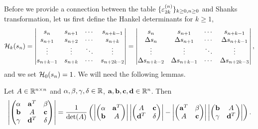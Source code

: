Before we provide a connection between the table $\{ \varepsilon_{2k}^{(n)} \}_{k\ge 0, n\ge 0}$ and Shanks transformation, let us first define the Hankel determinants for $k \ge 1$, 
\begin{equation}
    \mathcal H_k(s_n) = \left|\begin{matrix}
        s_n & s_{n+1} & \cdots & s_{n+k- 1} \\
        s_{n+1} & s_{n+2} & \cdots & s_{n + k} \\
        \vdots & \vdots & \ddots & \vdots \\
        s_{n+k-1} & s_{n+k} & \cdots & s_{n+2k-2} 
    \end{matrix}\right| = \left|\begin{matrix}
        s_n & s_{n+1} & \cdots & s_{n+k- 1} \\
        \Delta s_{n} & \Delta s_{n+1} & \cdots &\Delta s_{n + k - 1} \\
        \vdots & \vdots & \ddots & \vdots \\
        \Delta s_{n+k-2} & \Delta s_{n+k - 1} & \cdots & \Delta s_{n+2k-3} 
    \end{matrix}\right| ,
\end{equation}
and we set $\mathcal H_0(s_n) = 1$. We will need the following lemmas.
\begin{lemma}
\label{Lem: 4-SYL-DET-ID}
Let $A\in \mathbb R^{n\times n}$ and $\alpha, \beta,\gamma, \delta\in\mathbb R$, $\mathbf a, \mathbf b,\mathbf c,\mathbf d\in\mathbb R^{n}$. Then
\begin{equation}
     \left| \begin{pmatrix}
      \alpha & \mathbf a^{T} & \beta  \\
        \mathbf b & A & \mathbf c \\
        \gamma & \mathbf d^T & \delta 
    \end{pmatrix}\right| = \frac{1}{\det(A)} \left(  \left| \begin{pmatrix}
      \alpha & \mathbf a^{T}   \\
        \mathbf b & A  
    \end{pmatrix}\right|     \left| \begin{pmatrix}
     A & \mathbf c \\
       \mathbf d^T & \delta 
    \end{pmatrix}\right|  -     \left| \begin{pmatrix}
      \mathbf a^{T} & \beta  \\
         A & \mathbf c \\ 
    \end{pmatrix}\right|     \left| \begin{pmatrix}
        \mathbf b & A  \\
        \gamma & \mathbf d^T  
    \end{pmatrix}\right| \right).
\end{equation}
\end{lemma}

